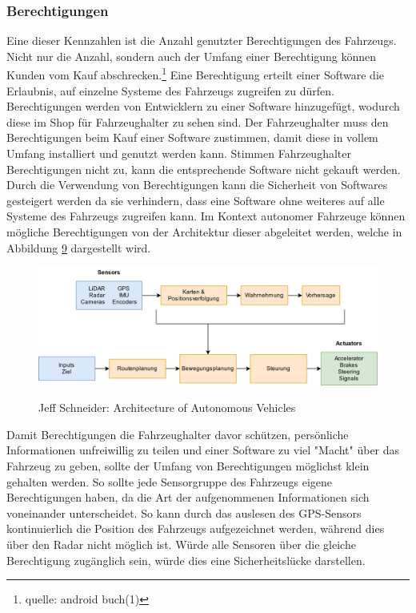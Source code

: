 \subsubsection{Berechtigungen}
Eine dieser Kennzahlen ist die Anzahl genutzter Berechtigungen des Fahrzeugs. Nicht nur die Anzahl, sondern auch der Umfang einer Berechtigung können Kunden vom Kauf abschrecken.\footnote{quelle: android buch(1)} Eine Berechtigung erteilt einer Software die Erlaubnis, auf einzelne Systeme des Fahrzeugs zugreifen zu dürfen. Berechtigungen werden von Entwicklern zu einer Software hinzugefügt, wodurch diese im Shop für Fahrzeughalter zu sehen sind. Der Fahrzeughalter muss den Berechtigungen beim Kauf einer Software zustimmen, damit diese in vollem Umfang installiert und genutzt werden kann. Stimmen Fahrzeughalter Berechtigungen nicht zu, kann die entsprechende Software nicht gekauft werden. Durch die Verwendung von Berechtigungen kann die Sicherheit von Softwares gesteigert werden da sie verhindern, dass eine Software ohne weiteres auf alle Systeme des Fahrzeugs zugreifen kann. Im Kontext autonomer Fahrzeuge können mögliche Berechtigungen von der Architektur dieser abgeleitet werden, welche in Abbildung \hyperref[img:av_architecture]{9} dargestellt wird. 
\begin{figure}[H]
	\centering
	\includegraphics[width=0.95\columnwidth]{pictures/arichtecture_AV.png}
	\label{img:av_architecture}
	\caption{Jeff Schneider: Architecture of Autonomous Vehicles}
\end{figure}

Damit Berechtigungen die Fahrzeughalter davor schützen, persönliche Informationen unfreiwillig zu teilen und einer Software zu viel "Macht" über das Fahrzeug zu geben, sollte der Umfang von Berechtigungen möglichst klein gehalten werden. So sollte jede Sensorgruppe des Fahrzeugs eigene Berechtigungen haben, da die Art der aufgenommenen Informationen sich voneinander unterscheidet. So kann durch das auslesen des GPS-Sensors kontinuierlich die Position des Fahrzeugs aufgezeichnet werden, während dies über den Radar nicht möglich ist. Würde alle Sensoren über die gleiche Berechtigung zugänglich sein, würde dies eine Sicherheitslücke darstellen.\\

